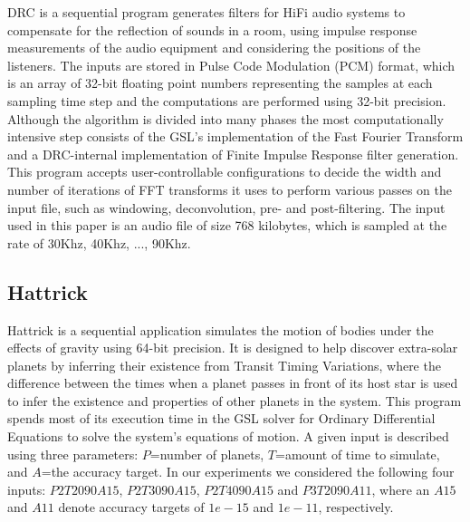 \documentclass{sig-alternate}
\newcommand{\sui}[1]{%
  \textcolor{green}{SC-#1}
}
\begin{document}
{DRC is a sequential program generates filters for HiFi audio systems to compensate for the reflection of sounds in a room, using impulse response measurements of the audio equipment and considering the positions of the listeners.
The inputs are stored in Pulse Code Modulation (PCM) format, which is an array of 32-bit floating point numbers representing the samples at each sampling time step and the computations are performed using 32-bit precision.
Although the algorithm is divided into many phases the most computationally intensive step consists of the GSL's implementation of the Fast Fourier Transform and a DRC-internal implementation of Finite Impulse Response filter generation.
This program accepts user-controllable configurations to decide the width and number of iterations of FFT transforms it uses to perform various passes on the input file, such as windowing, deconvolution, pre- and post-filtering.
The input used in this paper is an audio file of size 768 kilobytes, which is sampled at the rate of 30Khz, 40Khz, ..., 90Khz.

\subsection{Hattrick}
\label{sec:apps:hattrick}
Hattrick is a sequential application simulates the motion of bodies under the effects of gravity using 64-bit precision.
It is designed to help discover extra-solar planets by inferring their existence from Transit Timing Variations, where the difference between the times when a planet passes in front of its host star is used to infer the existence and properties of other planets in the system.
This program spends most of its execution time in the GSL solver for Ordinary Differential Equations to solve the system's equations of motion.
A given input is described using three parameters: $P$=number of planets, $T$=amount of time to simulate, and $A$=the accuracy target.
In our experiments we considered the following four inputs: $P2T2090A15$, $P2T3090A15$, $P2T4090A15$ and $P3T2090A11$, where an $A15$ and $A11$ denote accuracy targets of $1e-15$ and $1e-11$, respectively.


}
\end{document}
